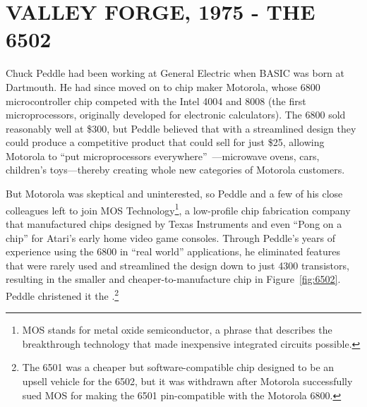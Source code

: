 
\section{VALLEY FORGE, 1975 - THE 6502}


Chuck Peddle had been working at General Electric when BASIC was
born at Dartmouth.  He had since moved on to chip maker Motorola, whose 6800
microcontroller chip competed with the Intel 4004 and
8008 (the first microprocessors, originally developed for
electronic calculators).  The 6800 sold reasonably well at \$300, but
Peddle  believed that with a streamlined design they could
produce a competitive product that could sell for just \$25,
allowing Motorola to ``put
microprocessors everywhere''~\cite[p. 31]{commodore}---microwave ovens,
cars, children's toys---thereby creating whole new categories of Motorola customers.

But Motorola was skeptical and uninterested, so Peddle and a few of his close
colleagues left to join MOS Technology\footnote{MOS stands
  for metal oxide 
semiconductor, a phrase that describes the breakthrough technology that
made inexpensive integrated circuits possible.}, a low-profile chip
fabrication company that manufactured chips designed by
Texas Instruments  and even ``Pong on a chip'' for Atari's early
home video game consoles.
Through Peddle's years
of experience using the 6800 in ``real world'' applications,
he eliminated features that were rarely used and streamlined the design
down to just 4300 transistors, resulting in the smaller and
cheaper-to-manufacture chip in Figure~\ref{fig:6502}.  Peddle
christened it the .\footnote{The 6501 was a 
  cheaper but software-compatible chip designed to be an upsell
  vehicle for the 6502, but it was withdrawn after Motorola successfully
  sued MOS for making the 6501 
  pin-compatible with the Motorola 6800.}


